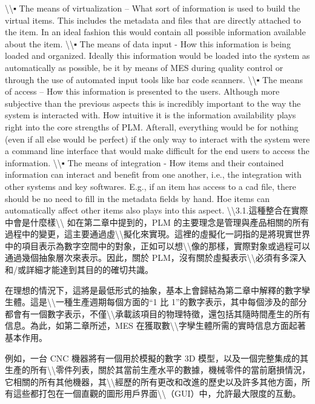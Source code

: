\textbackslash\textbackslash▪ The means of virtualization -- What sort
of information is used to build the virtual items. This includes the
metadata and files that are directly attached to the item. In an ideal
fashion this would contain all possible information available about the
item. \textbackslash\textbackslash▪ The means of data input - How this
information is being loaded and organized. Ideally this information
would be loaded into the system as automatically as possible, be it by
means of MES during quality control or through the use of automated
input tools like bar code scanners. \textbackslash\textbackslash▪ The
means of access -- How this information is presented to the users.
Although more subjective than the previous aspects this is incredibly
important to the way the system is interacted with. How intuitive it is
the information availability plays right into the core strengths of PLM.
Afterall, everything would be for nothing (even if all else would be
perfect) if the only way to interact with the system were a command line
interface that would make difficult for the end users to access the
information. \textbackslash\textbackslash▪ The means of integration -
How items and their contained information can interact and benefit from
one another, i.e., the integration with other systems and key softwares.
E.g., if an item has access to a cad file, there should be no need to
fill in the metadata fields by hand. Hoe items can automatically affect
other items also plays into this aspect.
\textbackslash\textbackslash3.1.這種整合在實際中會是什麼樣\textbackslash\textbackslash{}
如在第二章中提到的，PLM
的主要理念是管理與產品相關的所有過程中的變更，這主要通過虛\textbackslash\textbackslash 擬化來實現。這裡的虛擬化一詞指的是將現實世界中的項目表示為數字空間中的對象，正如可以想\textbackslash\textbackslash 像的那樣，實際對象或過程可以通過幾個抽象層次來表示。因此，關於
PLM，沒有關於虛擬表示\textbackslash\textbackslash 必須有多深入和/或詳細才能達到其目的的確切共識。

在理想的情況下，這將是最低形式的抽象，基本上會歸結為第二章中解釋的數字孿生體。這是\textbackslash\textbackslash 一種生產週期每個方面的``1
比
1''的數字表示，其中每個涉及的部分都會有一個數字表示，不僅\textbackslash\textbackslash 承載該項目的物理特徵，還包括其隨時間產生的所有信息。為此，如第二章所述，MES
在獲取數\textbackslash\textbackslash 字孿生體所需的實時信息方面起著基本作用。

例如，一台 CNC 機器將有一個用於模擬的數字 3D
模型，以及一個完整集成的其生產的所有\textbackslash\textbackslash 零件列表，關於其當前生產水平的數據，機械零件的當前磨損情況，它相關的所有其他機器，其\textbackslash\textbackslash 經歷的所有更改和改進的歷史以及許多其他方面，所有這些都打包在一個直觀的圖形用戶界面\textbackslash\textbackslash（GUI）中，允許最大限度的互動。

